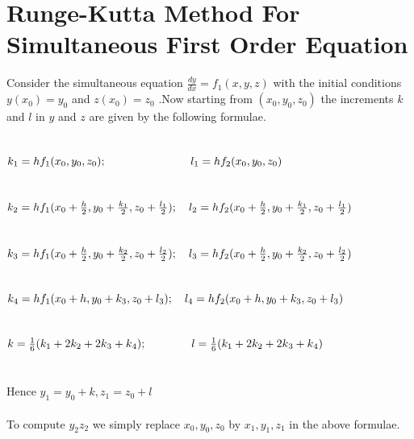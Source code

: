 \documentclass{report}
\begin{document}
		\section{Runge-Kutta Method For Simultaneous First Order Equation}
			Consider the simultaneous equation $\frac{dy}{dx} = f_{1}(x,y,z)$ with the initial conditions $y(x_{0}) = y_{0}$ and $z(x_{0}) = z_{0}$ .Now starting from $(x_{0},y_{0},z_{0})$ the increments $k$ and $l$ in $y$ and $z$ are given by the following formulae. \\ \\ \\
			\hspace*{4 em}$k_{1} = hf_{1}(x_{0},y_{0},z_{0}); \hspace*{7.5 em} l_{1} = hf_{2}(x_{0},y_{0},z_{0})$\\ \\ \\
			\hspace*{4 em}$k_{2} = hf_{1}(x_{0} + \frac{h}{2},y_{0}+ \frac{k_{1}}{2},z_{0}+ \frac{l_{1}}{2}); \hspace*{1 em} l_{2} = hf_{2}(x_{0}+ \frac{h}{2},y_{0}+ \frac{k_{1}}{2},z_{0}+ \frac{l_{1}}{2})$\\ \\ \\
			\hspace*{4 em}$k_{3} = hf_{1}(x_{0}+ \frac{h}{2},y_{0}+ \frac{k_{2}}{2},z_{0}+ \frac{l_{2}}{2}); \hspace*{1 em} l_{3} = hf_{2}(x_{0}+ \frac{h}{2},y_{0}+ \frac{k_{2}}{2},z_{0}+ \frac{l_{2}}{2})$\\ \\ \\
			\hspace*{4 em}$k_{4} = hf_{1}(x_{0} + h,y_{0} + k _{3},z_{0} + l_{3}); \hspace*{1 em} l_{4} = hf_{2}(x_{0} + h,y_{0} + k_{3},z_{0} + l_{3})$\\ \\ \\
			\hspace*{4 em}$k = \frac{1}{6}(k_{1} + 2k_{2} + 2k{_3} + k{_4}); \hspace*{4 em} l = \frac{1}{6}(k_{1} + 2k_{2} + 2k{_3} + k{_4})$\\ \\ \\
			Hence $y_{1} = y_{0} + k, z_{1} = z_{0} + l$\\ \\
			To compute $y_{2} z_{2}$ we simply replace $x_{0},y_{0},z_{0}$ by $x_{1},y_{1},z_{1}$ in the above formulae. \\ \\
\end{document}
